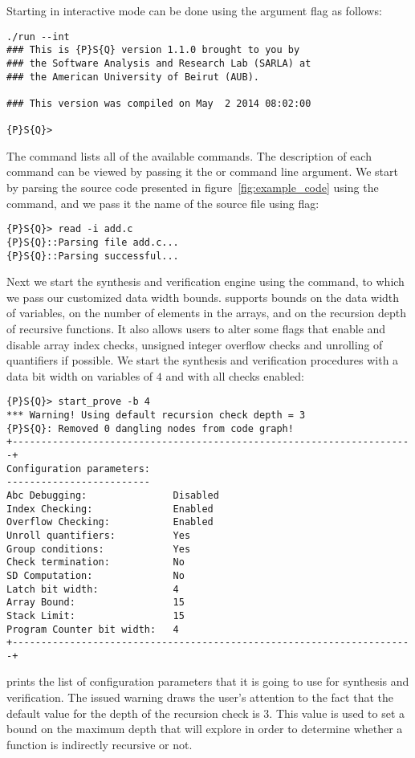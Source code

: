 Starting \mytool{} in interactive mode can be done using the  argument flag as follows:
\begin{Verbatim}[fontsize=\relsize{-2.0}, frame=lines]
./run --int
### This is {P}S{Q} version 1.1.0 brought to you by
### the Software Analysis and Research Lab (SARLA) at
### the American University of Beirut (AUB).

### This version was compiled on May  2 2014 08:02:00

{P}S{Q}>
\end{Verbatim}
The  command lists all of the available \mytool{} commands. The description of each command can be 
viewed by passing it the  or  command line argument. We start by parsing the source code
presented in figure~\ref{fig:example_code} using the  command, and we pass it the name of the source file
using  flag:
\begin{Verbatim}[fontsize=\relsize{-2.0}]
{P}S{Q}> read -i add.c 
{P}S{Q}::Parsing file add.c...
{P}S{Q}::Parsing successful...
\end{Verbatim}
Next we start the synthesis and verification engine using the  command, to which we 
pass our customized data width bounds. \mytool{} supports bounds on the data width of variables, 
on the number of elements in the arrays, and on the recursion depth of recursive functions.  
It also allows users to alter some flags that enable and disable array index checks, unsigned
integer overflow checks and unrolling of quantifiers if possible. We start the synthesis and verification
procedures with a data bit width on variables of $4$ and with all checks enabled:
\begin{Verbatim}[fontsize=\relsize{-2.0}]
{P}S{Q}> start_prove -b 4
*** Warning! Using default recursion check depth = 3
{P}S{Q}: Removed 0 dangling nodes from code graph!
+----------------------------------------------------------------------+
Configuration parameters:
-------------------------
Abc Debugging:               Disabled
Index Checking:              Enabled
Overflow Checking:           Enabled
Unroll quantifiers:          Yes
Group conditions:            Yes
Check termination:           No
SD Computation:              No
Latch bit width:             4
Array Bound:                 15
Stack Limit:                 15
Program Counter bit width:   4
+----------------------------------------------------------------------+
\end{Verbatim}
\mytool{} prints the list of configuration parameters that it is going to use for synthesis
and verification. The issued warning draws the user's attention to the fact that the 
default value for the depth of the recursion check is $3$. This value is used to set a bound 
on the maximum depth that \mytool{} will explore in order to determine whether a function 
is indirectly recursive or not. 

